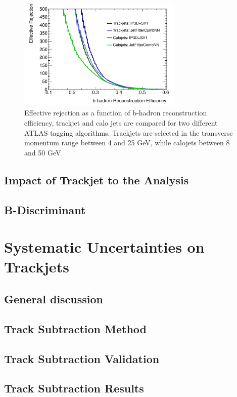 \begin{figure}[tp]
\centering
\includegraphics[width=0.7\textwidth]{figure/trackjet/eff_real_rej_mod.pdf}
\caption{Effective rejection as a function of b-hadron reconstruction efficiency, trackjet and calo jets are
	compared for two different ATLAS tagging algorithms. Trackjets are selected in the transverse momentum range 
	between 4 and 25 GeV, while calojets between 8 and 50 GeV.}
\label{fig:cj_tj}
\end{figure}    



\subsection{Impact of Trackjet to the Analysis} %
\subsection{B-Discriminant} %

\section{Systematic Uncertainties on Trackjets}
\subsection{General discussion}
\subsection{Track Subtraction Method} %
\subsection{Track Subtraction Validation} %
\subsection{Track Subtraction Results}

